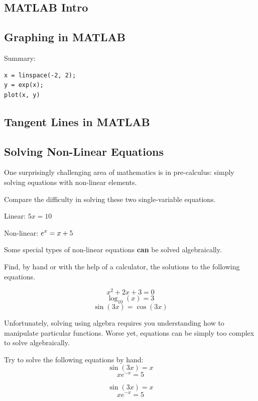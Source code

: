 \newpage
{}
\subsection*{MATLAB Intro}


\newpage
{}
\subsection*{Graphing in MATLAB}

Summary:

\begin{verbatim}
x = linspace(-2, 2);
y = exp(x);
plot(x, y)
\end{verbatim}


\newpage
{}
\subsection*{Tangent Lines in MATLAB}


\newpage
{}
\subsection*{Solving Non-Linear Equations}

One surprisingly challenging area of mathematics is in pre-calculus:
simply solving equations with non-linear elements.

\problem Compare the difficulty in solving these two single-variable
equations.

Linear: $5 x = 10$ \vfill

Non-linear: $\displaystyle e^x = x+5$ \vfill

\newpage

Some special types of non-linear equations {\bf can} be solved
algebraically.

\problem Find, by hand or with the help of a calculator, the solutions
to the following equations.

\[ x^2 + 2x + 3 = 0 \]
\vfill
\[ \log_{10}(x) = 3 \]
\vfill
\[ \sin(3x) = \cos(3x) \]
\vfill 
\newpage

Unfortunately, solving using algebra requires you understanding how to
manipulate particular functions.  Worse yet, equations can be simply
too complex to solve algebraically.

\problem Try to solve the following equations by hand: 
\[ \sin(3x) = x \]
\vfill
\[ xe^{-x} = 5 \]
\vfill

\newpage
\[ \sin(3x) = x \] 
\[ xe^{-x} = 5 \] 

